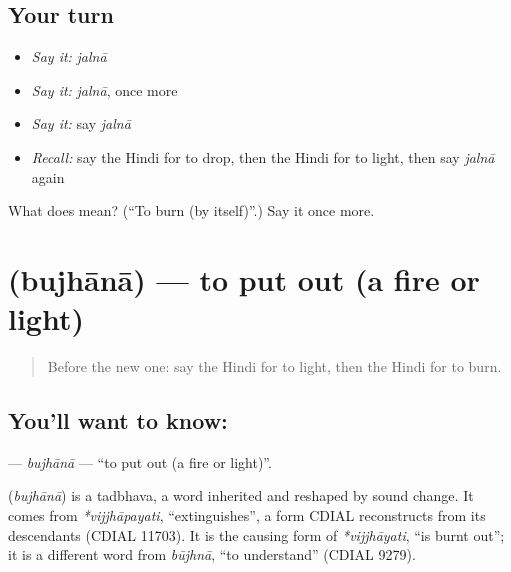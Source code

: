 \subsection*{Your turn}
\begin{itemize}
\raggedright
  \item \emph{Say it:} \emph{jalnā}
  \item \emph{Say it:} \emph{jalnā}, once more
  \item \emph{Say it:} say \emph{jalnā}
  \item \emph{Recall:} say the Hindi for to drop, then the Hindi for to light, then say \emph{jalnā} again
\end{itemize}

\begin{tcolorbox}[breakable,colback=teal!4,colframe=teal!35!black,title={Before you move on}]
What does  mean? (\textquotedblleft{}To burn (by itself)\textquotedblright{}.) Say it once more.
\end{tcolorbox}
\section[\texorpdfstring{\hi{बुझाना} (bujhānā)}{बुझाना (bujhānā)}]{ (bujhānā) — to put out (a fire or light)}

\label{lesson:HI-C175-bujhana}



\begin{quote}
Before the new one: say the Hindi for to light, then the Hindi for to burn.
\end{quote}

\subsection*{You'll want to know: }
\textbf{} — \emph{bujhānā} — \textquotedblleft{}to put out (a fire or light)\textquotedblright{}.

\begin{cousinweb}
\textbf{} (\emph{bujhānā}) is a tadbhava, a word inherited and reshaped by sound change. It comes from \emph{*vijjhāpayati}, \textquotedblleft{}extinguishes\textquotedblright{}, a form CDIAL reconstructs from its descendants (CDIAL 11703). It is the causing form of \emph{*vijjhāyati}, \textquotedblleft{}is burnt out\textquotedblright{}; it is a different word from \emph{būjhnā}, \textquotedblleft{}to understand\textquotedblright{} (CDIAL 9279).
\end{cousinweb}

